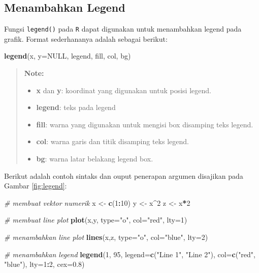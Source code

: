 \documentclass[]{book}
\newenvironment{Shaded}{\begin{snugshade}}{\end{snugshade}}
\newcommand{\KeywordTok}[1]{\textcolor[rgb]{0.13,0.29,0.53}{\textbf{#1}}}
\newcommand{\DataTypeTok}[1]{\textcolor[rgb]{0.13,0.29,0.53}{#1}}
\newcommand{\DecValTok}[1]{\textcolor[rgb]{0.00,0.00,0.81}{#1}}
\newcommand{\FloatTok}[1]{\textcolor[rgb]{0.00,0.00,0.81}{#1}}
\newcommand{\StringTok}[1]{\textcolor[rgb]{0.31,0.60,0.02}{#1}}
\newcommand{\CommentTok}[1]{\textcolor[rgb]{0.56,0.35,0.01}{\textit{#1}}}
\newcommand{\OtherTok}[1]{\textcolor[rgb]{0.56,0.35,0.01}{#1}}
\newcommand{\OperatorTok}[1]{\textcolor[rgb]{0.81,0.36,0.00}{\textbf{#1}}}
\newcommand{\NormalTok}[1]{#1}
\providecommand{\tightlist}{%
  \setlength{\itemsep}{0pt}\setlength{\parskip}{0pt}}
\begin{document}
\subsection{Menambahkan Legend}\label{menambahkan-legend}

Fungsi \texttt{legend()} pada \texttt{R} dapat digunakan untuk
menambahkan legend pada grafik. Format sederhananya adalah sebagai
berikut:

\begin{Shaded}
\begin{Highlighting}[]
\KeywordTok{legend}\NormalTok{(x, }\DataTypeTok{y=}\OtherTok{NULL}\NormalTok{, legend, fill, col, bg)}
\end{Highlighting}
\end{Shaded}

\begin{quote}
\textbf{Note: }

\begin{itemize}
\tightlist
\item
  \textbf{x} dan \textbf{y}: koordinat yang digunakan untuk posisi
  legend.
\item
  \textbf{legend}: teks pada legend
\item
  \textbf{fill}: warna yang digunakan untuk mengisi box disamping teks
  legend.
\item
  \textbf{col}: warna garis dan titik disamping teks legend.
\item
  \textbf{bg}: warna latar belakang legend box.
\end{itemize}
\end{quote}

Berikut adalah contoh sintaks dan ouput penerapan argumen disajikan pada
Gambar \ref{fig:legend}:

\begin{Shaded}
\begin{Highlighting}[]
\CommentTok{# membuat vektor numerik}
\NormalTok{x <-}\StringTok{ }\KeywordTok{c}\NormalTok{(}\DecValTok{1}\OperatorTok{:}\DecValTok{10}\NormalTok{)}
\NormalTok{y <-}\StringTok{ }\NormalTok{x}\OperatorTok{^}\DecValTok{2}
\NormalTok{z <-}\StringTok{ }\NormalTok{x}\OperatorTok{*}\DecValTok{2}

\CommentTok{# membuat line plot}
\KeywordTok{plot}\NormalTok{(x,y, }\DataTypeTok{type=}\StringTok{"o"}\NormalTok{, }\DataTypeTok{col=}\StringTok{"red"}\NormalTok{, }\DataTypeTok{lty=}\DecValTok{1}\NormalTok{)}

\CommentTok{# menambahkan line plot}
\KeywordTok{lines}\NormalTok{(x,z, }\DataTypeTok{type=}\StringTok{"o"}\NormalTok{, }\DataTypeTok{col=}\StringTok{"blue"}\NormalTok{, }\DataTypeTok{lty=}\DecValTok{2}\NormalTok{)}

\CommentTok{# menambahkan legend}
\KeywordTok{legend}\NormalTok{(}\DecValTok{1}\NormalTok{, }\DecValTok{95}\NormalTok{, }\DataTypeTok{legend=}\KeywordTok{c}\NormalTok{(}\StringTok{"Line 1"}\NormalTok{, }\StringTok{"Line 2"}\NormalTok{),}
       \DataTypeTok{col=}\KeywordTok{c}\NormalTok{(}\StringTok{"red"}\NormalTok{, }\StringTok{"blue"}\NormalTok{), }\DataTypeTok{lty=}\DecValTok{1}\OperatorTok{:}\DecValTok{2}\NormalTok{, }\DataTypeTok{cex=}\FloatTok{0.8}\NormalTok{)}
\end{Highlighting}
\end{Shaded}
\end{document}
